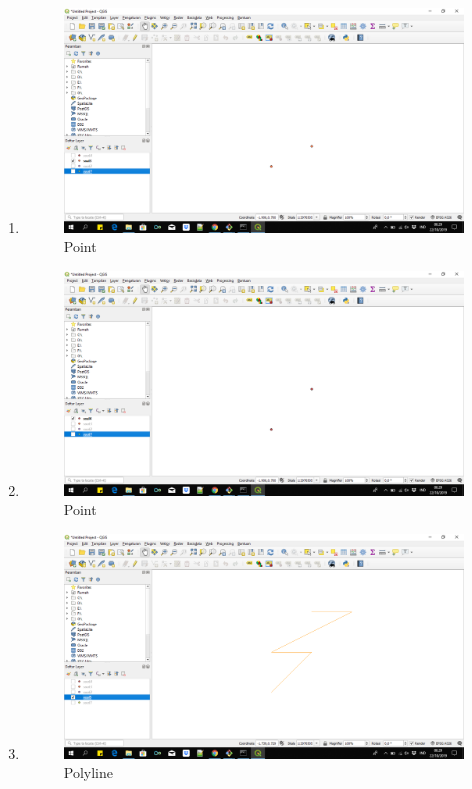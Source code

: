 \begin{enumerate}
	\item 
	
	\begin{figure}[H]
		\includegraphics[width=12cm]{figures/1174063/3.PNG}
		\centering
		\caption{Point}
	\end{figure}
	
	\item 
	
	\begin{figure}[H]
		\includegraphics[width=12cm]{figures/1174063/4.PNG}
		\centering
		\caption{Point}
	\end{figure}
	
	\item 
	
	\begin{figure}[H]
		\includegraphics[width=12cm]{figures/1174063/5.PNG}
		\centering
		\caption{Polyline}
	\end{figure}
	

\end{enumerate}
